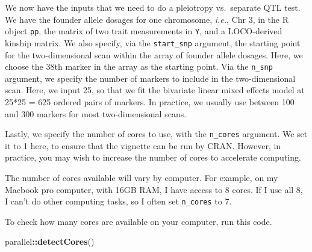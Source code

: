 \documentclass[oneside]{book}\usepackage[]{graphicx}\usepackage[]{color}
\newenvironment{Shaded}{\begin{snugshade}}{\end{snugshade}}
\newcommand{\CommentTok}[1]{\textcolor[rgb]{0.56,0.35,0.01}{\textit{#1}}}
\newcommand{\DataTypeTok}[1]{\textcolor[rgb]{0.13,0.29,0.53}{#1}}
\newcommand{\DecValTok}[1]{\textcolor[rgb]{0.00,0.00,0.81}{#1}}
\newcommand{\KeywordTok}[1]{\textcolor[rgb]{0.13,0.29,0.53}{\textbf{#1}}}
\newcommand{\NormalTok}[1]{#1}
\newcommand{\OperatorTok}[1]{\textcolor[rgb]{0.81,0.36,0.00}{\textbf{#1}}}
\newcommand{\StringTok}[1]{\textcolor[rgb]{0.31,0.60,0.02}{#1}}
\begin{document}
We now have the inputs that we need to do a pleiotropy vs.~separate QTL
test. We have the founder allele dosages for one chromosome,
\emph{i.e.}, Chr 3, in the R object \texttt{pp}, the matrix of two trait
measurements in \texttt{Y}, and a LOCO-derived kinship matrix. We also
specify, via the \texttt{start\_snp} argument, the starting point for
the two-dimensional scan within the array of founder allele dosages.
Here, we choose the 38th marker in the array as the starting point. Via
the \texttt{n\_snp} argument, we specify the number of markers to
include in the two-dimensional scan. Here, we input 25, so that we fit
the bivariate linear mixed effects model at 25*25 = 625 ordered pairs of
markers. In practice, we usually use between 100 and 300 markers for
most two-dimensional scans.

Lastly, we specify the number of cores to use, with the
\texttt{n\_cores} argument. We set it to 1 here, to ensure that the
vignette can be run by CRAN. However, in practice, you may wish to
increase the number of cores to accelerate computing.

\begin{Shaded}
\end{Shaded}

The number of cores available will vary by computer. For example, on my
Macbook pro computer, with 16GB RAM, I have access to 8 cores. If I use
all 8, I can't do other computing tasks, so I often set
\texttt{n\_cores} to 7.

To check how many cores are available on your computer, run this code.

\begin{Shaded}
\begin{Highlighting}[]
\NormalTok{parallel}\OperatorTok{::}\KeywordTok{detectCores}\NormalTok{()}
\end{Highlighting}
\end{Shaded}
\end{document}
